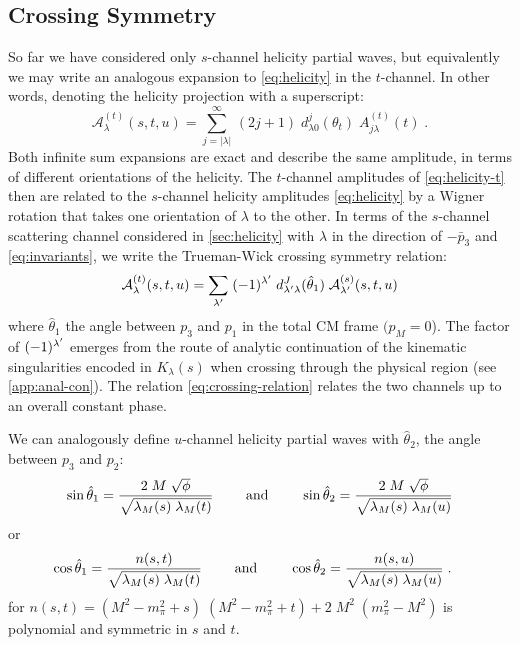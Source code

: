 \subsection{Crossing Symmetry} \label{sec:crossing}
 So far we have considered only \(s\)-channel helicity partial waves, but equivalently we may write an analogous expansion to \cref{eq:helicity} in the \(t\)-channel. In other words, denoting the helicity projection with a superscript:
 \begin{equation}
   \label{eq:helicity-t}
   \mathcal{A}^{(t)}_\lambda(s, t, u) = \sum_{j = |\lambda|}^\infty \, (2j+1) \; d^{j}_{\lambda0}(\theta_t) \; A^{(t)}_{j\lambda}(t) \; .
 \end{equation}
Both infinite sum expansions are exact and describe the same amplitude, in terms of different orientations of the helicity. The \(t\)-channel amplitudes of \cref{eq:helicity-t} then are related to the \(s\)-channel helicity amplitudes \cref{eq:helicity} by a Wigner rotation that takes one orientation of \(\lambda\) to the other.
In terms of the \(s\)-channel scattering channel considered in \cref{sec:helicity} with \(\lambda\) in the direction of \(-\bar{p}_3\) and \cref{eq:invariants}, we write the Trueman-Wick crossing symmetry relation:
  \begin{equation}
    \label{eq:crossing-relation}
    \mathcal{A}_\lambda^{(t)}(s, t, u) = \sum_{\lambda^\prime} \;  (-1)^{\lambda^\prime} \;d_{\lambda^\prime \lambda}^J(\hat{\theta}_1) \; \mathcal{A}_{\lambda^\prime}^{(s)}(s,t,u)
  \end{equation}
where \(\hat{\theta}_1\) the angle between \(p_3\) and \(p_1\) in the total CM frame \((p_M = 0\)). The factor of \((-1)^{\lambda^\prime}\) emerges from the route of analytic continuation of the kinematic singularities encoded in \(K_\lambda(s)\) when crossing through the physical region (see \cref{app:anal-con}). The relation \cref{eq:crossing-relation} relates the two channels up to an overall constant phase.

 We can analogously define \(u\)-channel helicity partial waves with \(\hat{\theta}_2\), the angle between \(p_3\) and \(p_2\):
  \begin{align} \label{sin-hat}
    \sin\hat{\theta}_1 = \frac{
    2 \; M \; \sqrt{\phi}
    }{
    \sqrt{\lambda_M(s) \;  \lambda_M(t)}
    }
    \qquad \text{ and } \qquad
    \sin\hat{\theta}_2 = \frac{
    2 \; M \; \sqrt{\phi}
    }{
    \sqrt{\lambda_M(s) \;  \lambda_M(u)}
    }
  \end{align}
or
  \begin{align} \label{cos-hat}
    \cos\hat{\theta}_1 &= \frac{n(s,t)}
    {\sqrt{\lambda_M(s) \; \lambda_M(t)}} \qquad \text{ and } \qquad
    \cos\hat{\theta}_2 = \frac{n(s,u)}
    {\sqrt{\lambda_M(s) \; \lambda_M(u)}} \; .
  \end{align}
for \(n(s,t) =  (M^2 - m_\pi^2 + s) \; (M^2 - m_\pi^2  + t)  + 2 \; M^2 \; (m_\pi^2 -M^2)\) is polynomial and symmetric in \(s\) and \(t\).

